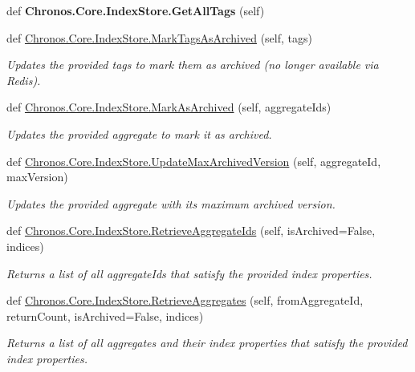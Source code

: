 \begin{DoxyCompactItemize}
\item 
def {\bfseries Chronos.\+Core.\+Index\+Store.\+Get\+All\+Tags} (self)\hypertarget{group__Chronos_ga39a553eaf5ed15bde30c2b43f2b563c5}{}\label{group__Chronos_ga39a553eaf5ed15bde30c2b43f2b563c5}

\item 
def \hyperlink{group__Chronos_gae214bee43e5148b5190c7ba0f6aa63ef}{Chronos.\+Core.\+Index\+Store.\+Mark\+Tags\+As\+Archived} (self, tags)
\begin{DoxyCompactList}\small\item\em Updates the provided tags to mark them as archived (no longer available via Redis). \end{DoxyCompactList}\item 
def \hyperlink{group__Chronos_ga04d2c0aa20ac6cfe356b724e8c62dd8b}{Chronos.\+Core.\+Index\+Store.\+Mark\+As\+Archived} (self, aggregate\+Ids)
\begin{DoxyCompactList}\small\item\em Updates the provided aggregate to mark it as archived. \end{DoxyCompactList}\item 
def \hyperlink{group__Chronos_gae824d1e632ce32a311c6a07756f17c28}{Chronos.\+Core.\+Index\+Store.\+Update\+Max\+Archived\+Version} (self, aggregate\+Id, max\+Version)
\begin{DoxyCompactList}\small\item\em Updates the provided aggregate with its maximum archived version. \end{DoxyCompactList}\item 
def \hyperlink{group__Chronos_ga960e19d8f65569f80fd580eebd605031}{Chronos.\+Core.\+Index\+Store.\+Retrieve\+Aggregate\+Ids} (self, is\+Archived=False, indices)
\begin{DoxyCompactList}\small\item\em Returns a list of all aggregate\+Ids that satisfy the provided index properties. \end{DoxyCompactList}\item 
def \hyperlink{group__Chronos_ga3e51459a6d624a6abf12d983139e6acd}{Chronos.\+Core.\+Index\+Store.\+Retrieve\+Aggregates} (self, from\+Aggregate\+Id, return\+Count, is\+Archived=False, indices)
\begin{DoxyCompactList}\small\item\em Returns a list of all aggregates and their index properties that satisfy the provided index properties. \end{DoxyCompactList}\item 

\end{DoxyCompactItemize}
